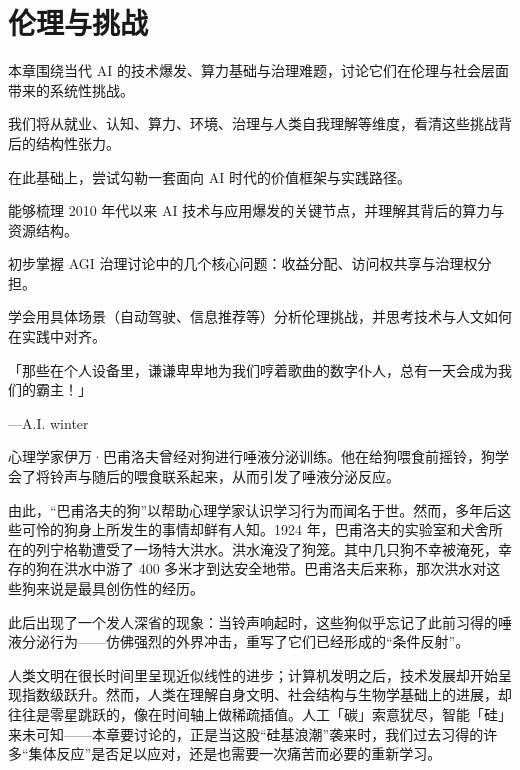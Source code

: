 \chapter{伦理与挑战}

\begin{introduction}
  \item 本章围绕当代 AI 的技术爆发、算力基础与治理难题，讨论它们在伦理与社会层面带来的系统性挑战。
  \item 我们将从就业、认知、算力、环境、治理与人类自我理解等维度，看清这些挑战背后的结构性张力。
  \item 在此基础上，尝试勾勒一套面向 AI 时代的价值框架与实践路径。
\end{introduction}

\begin{introduction}
  \item 能够梳理 2010 年代以来 AI 技术与应用爆发的关键节点，并理解其背后的算力与资源结构。
  \item 初步掌握 AGI 治理讨论中的几个核心问题：收益分配、访问权共享与治理权分担。
  \item 学会用具体场景（自动驾驶、信息推荐等）分析伦理挑战，并思考技术与人文如何在实践中对齐。
\end{introduction}

「那些在个人设备里，谦谦卑卑地为我们哼着歌曲的数字仆人，总有一天会成为我们的霸主！」
\begin{flushright}
---A.I. winter
\end{flushright}

心理学家伊万·巴甫洛夫曾经对狗进行唾液分泌训练。他在给狗喂食前摇铃，狗学会了将铃声与随后的喂食联系起来，从而引发了唾液分泌反应。

由此，“巴甫洛夫的狗”以帮助心理学家认识学习行为而闻名于世。然而，多年后这些可怜的狗身上所发生的事情却鲜有人知。1924 年，巴甫洛夫的实验室和犬舍所在的列宁格勒遭受了一场特大洪水。洪水淹没了狗笼。其中几只狗不幸被淹死，幸存的狗在洪水中游了 400 多米才到达安全地带。巴甫洛夫后来称，那次洪水对这些狗来说是最具创伤性的经历。

此后出现了一个发人深省的现象：当铃声响起时，这些狗似乎忘记了此前习得的唾液分泌行为——仿佛强烈的外界冲击，重写了它们已经形成的“条件反射”。

人类文明在很长时间里呈现近似线性的进步；计算机发明之后，技术发展却开始呈现指数级跃升。然而，人类在理解自身文明、社会结构与生物学基础上的进展，却往往是零星跳跃的，像在时间轴上做稀疏插值。人工「碳」索意犹尽，智能「硅」来未可知——本章要讨论的，正是当这股“硅基浪潮”袭来时，我们过去习得的许多“集体反应”是否足以应对，还是也需要一次痛苦而必要的重新学习。

